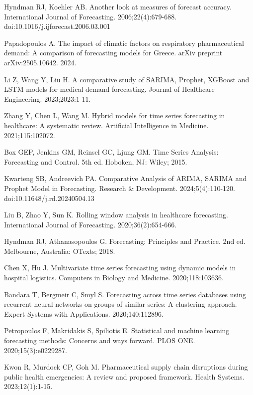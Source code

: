 \documentclass[12pt]{article}
\begin{document}
\begin{thebibliography}{99}
Hyndman RJ, Koehler AB. Another look at measures of forecast accuracy. International Journal of Forecasting. 2006;22(4):679-688. doi:10.1016/j.ijforecast.2006.03.001

Papadopoulos A. The impact of climatic factors on respiratory pharmaceutical demand: A comparison of forecasting models for Greece. arXiv preprint arXiv:2505.10642. 2024.

Li Z, Wang Y, Liu H. A comparative study of SARIMA, Prophet, XGBoost and LSTM models for medical demand forecasting. Journal of Healthcare Engineering. 2023;2023:1-11.

Zhang Y, Chen L, Wang M. Hybrid models for time series forecasting in healthcare: A systematic review. Artificial Intelligence in Medicine. 2021;115:102072.

Box GEP, Jenkins GM, Reinsel GC, Ljung GM. Time Series Analysis: Forecasting and Control. 5th ed. Hoboken, NJ: Wiley; 2015.

Kwarteng SB, Andreevich PA. Comparative Analysis of ARIMA, SARIMA and Prophet Model in Forecasting. Research \& Development. 2024;5(4):110-120. doi:10.11648/j.rd.20240504.13

Liu B, Zhao Y, Sun K. Rolling window analysis in healthcare forecasting. International Journal of Forecasting. 2020;36(2):654-666.

Hyndman RJ, Athanasopoulos G. Forecasting: Principles and Practice. 2nd ed. Melbourne, Australia: OTexts; 2018.

Chen X, Hu J. Multivariate time series forecasting using dynamic models in hospital logistics. Computers in Biology and Medicine. 2020;118:103636.

Bandara T, Bergmeir C, Smyl S. Forecasting across time series databases using recurrent neural networks on groups of similar series: A clustering approach. Expert Systems with Applications. 2020;140:112896.

Petropoulos F, Makridakis S, Spiliotis E. Statistical and machine learning forecasting methods: Concerns and ways forward. PLOS ONE. 2020;15(3):e0229287.

Kwon R, Murdock CP, Goh M. Pharmaceutical supply chain disruptions during public health emergencies: A review and proposed framework. Health Systems. 2023;12(1):1-15.

\end{thebibliography}
\end{document}

